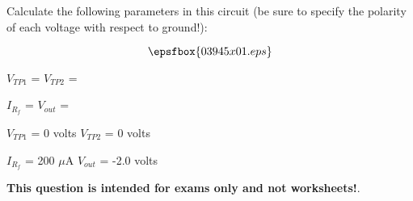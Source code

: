 

Calculate the following parameters in this circuit (be sure to specify the polarity of each voltage with respect to ground!):

$$\epsfbox{03945x01.eps}$$

$V_{TP1}$ = \hskip 80pt $V_{TP2}$ =

\vskip 10pt

$I_{R_f}$ = \hskip 80pt $V_{out}$ =







$V_{TP1}$ = 0 volts \hskip 50pt $V_{TP2}$ = 0 volts

\vskip 10pt

$I_{R_f}$ = 200 $\mu$A \hskip 50pt $V_{out}$ = -2.0 volts







{\bf This question is intended for exams only and not worksheets!}.




